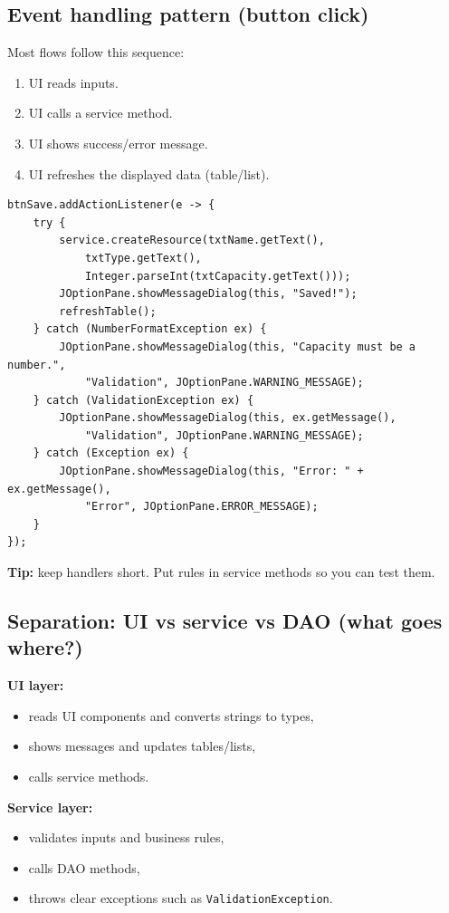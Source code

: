 \documentclass[11pt]{article}
\begin{document}
\subsection{Event handling pattern (button click)}
Most flows follow this sequence:
\begin{enumerate}
  \item UI reads inputs.
  \item UI calls a service method.
  \item UI shows success/error message.
  \item UI refreshes the displayed data (table/list).
\end{enumerate}

\begin{lstlisting}
btnSave.addActionListener(e -> {
    try {
        service.createResource(txtName.getText(),
            txtType.getText(),
            Integer.parseInt(txtCapacity.getText()));
        JOptionPane.showMessageDialog(this, "Saved!");
        refreshTable();
    } catch (NumberFormatException ex) {
        JOptionPane.showMessageDialog(this, "Capacity must be a number.",
            "Validation", JOptionPane.WARNING_MESSAGE);
    } catch (ValidationException ex) {
        JOptionPane.showMessageDialog(this, ex.getMessage(),
            "Validation", JOptionPane.WARNING_MESSAGE);
    } catch (Exception ex) {
        JOptionPane.showMessageDialog(this, "Error: " + ex.getMessage(),
            "Error", JOptionPane.ERROR_MESSAGE);
    }
});
\end{lstlisting}

\textbf{Tip:} keep handlers short. Put rules in service methods so you can test them.

\subsection{Separation: UI vs service vs DAO (what goes where?)}
\textbf{UI layer:}
\begin{itemize}
  \item reads UI components and converts strings to types,
  \item shows messages and updates tables/lists,
  \item calls service methods.
\end{itemize}

\textbf{Service layer:}
\begin{itemize}
  \item validates inputs and business rules,
  \item calls DAO methods,
  \item throws clear exceptions such as \texttt{ValidationException}.
\end{itemize}
\end{document}
